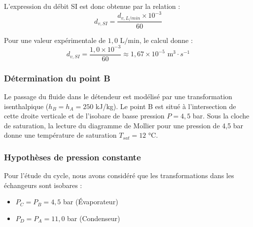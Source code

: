 \documentclass[a4paper,10pt,french]{scrartcl}
\begin{document}
L'expression du débit SI est donc obtenue par la relation :
$$d_{v, SI} = \frac{d_{v, L/min} \times 10^{-3}}{60}$$

Pour une valeur expérimentale de $1,0 \text{ L/min}$, le calcul donne :
$$d_{v, SI} = \frac{1,0 \times 10^{-3}}{60} \approx 1,67 \times 10^{-5} \text{ m}^3 \cdot s^{-1}$$







\subsubsection{Détermination du point B}
Le passage du fluide dans le détendeur est modélisé par une transformation isenthalpique ($h_B = h_A = 250$ kJ/kg). Le point B est situé à l'intersection de cette droite verticale et de l'isobare de basse pression $P = 4,5$ bar.
Sous la cloche de saturation, la lecture du diagramme de Mollier pour une pression de 4,5 bar donne une température de saturation $T_{sat} = 12$ °C. 

\subsubsection{Hypothèses de pression constante}
Pour l'étude du cycle, nous avons considéré que les transformations dans les échangeurs sont isobares :
\begin{itemize}
\item $P_C = P_B = 4,5$ bar (Évaporateur)
\item $P_D = P_A = 11,0$ bar (Condenseur)
\end{itemize}
\end{document}
